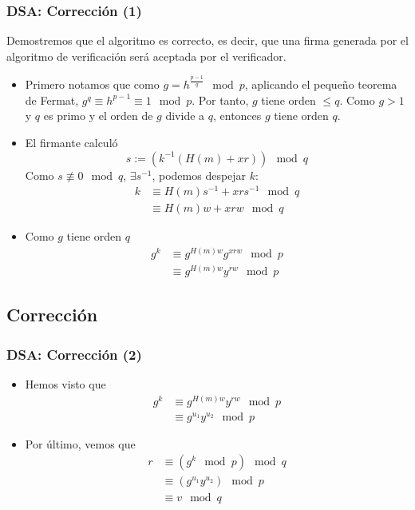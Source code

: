 \documentclass{beamer}
\begin{document}
\begin{frame}
    \frametitle{DSA: Corrección (1)}

    Demostremos que el algoritmo es correcto, es decir, que una firma generada por el algoritmo de verificación será aceptada por el verificador.

    \begin{itemize}
        \item Primero notamos que como $g = h^{\frac{p-1}{q}} \mod p$, aplicando el pequeño teorema de Fermat, $g^q \equiv h^{p-1} \equiv 1 \mod p$. Por tanto, $g$ tiene orden $\le q$. Como $g > 1$ y $q$ es primo y el orden de $g$ divide a $q$, entonces $g$ tiene orden $q$.
        \item El firmante calculó $$s := \left( k^{-1} \left( H(m) + x r  \right) \right) \mod q$$ Como $s \not\equiv 0 \mod q$, $\exists s^{-1}$, podemos despejar $k$:
        \begin{align*}
            k & \equiv H(m) s^{-1} + x r s^{-1} \mod q  \\
              & \equiv H(m) w + x r w \mod q
        \end{align*}
        
        \item Como $g$ tiene orden $q$
        \begin{align*}
            g^k & \equiv g^{H(m) w} g^{x r w} \mod p  \\
              & \equiv g^{H(m) w} y^{r w} \mod p
        \end{align*}
    \end{itemize}    
\end{frame}


\subsection{Corrección}

\begin{frame}
    \frametitle{DSA: Corrección (2)}

    \begin{itemize}
        \item Hemos visto que
        \begin{align*}
            g^k & \equiv g^{H(m) w} y^{r w} \mod p    \\
              & \equiv g^{u_1} y^{u_2} \mod p
        \end{align*}

        \item Por último, vemos que
        \begin{align*}
            r & \equiv \left( g^k \mod p \right) \mod q    \\
              & \equiv \left( g^{u_1} y^{u_2} \right) \mod p \\
              & \equiv v \mod q
        \end{align*}


    \end{itemize}    
\end{frame}
\end{document}
